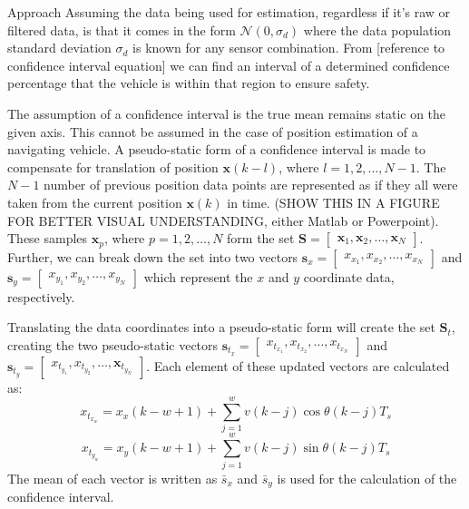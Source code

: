 \begin{section}{Approach}
Assuming the data being used for estimation, regardless if it's raw or filtered data, is that it comes in the form $\mathcal{N}(0,\sigma_d)$ where the data population standard deviation $\sigma_d$ is known for any sensor combination. From [reference to confidence interval equation] we can find an interval of a determined confidence percentage that the vehicle is within that region to ensure safety. 

The assumption of a confidence interval is the true mean remains static on the given axis. This cannot be assumed in the case of position estimation of a navigating vehicle. A pseudo-static form of a confidence interval is made to compensate for translation of position $\bm{x}(k-l)$, where $l=1,2,\dots,N-1$. The $N-1$ number of previous position data points are represented as if they all were taken from the current position $\bm{x}(k)$ in time. (SHOW THIS IN A FIGURE FOR BETTER VISUAL UNDERSTANDING, either Matlab or Powerpoint). These samples $\bm{x}_p$, where $p=1,2,\dots,N$ form the set $\mathcal{\bm{S}}=\begin{bmatrix}\bm{x}_1,\bm{x}_2,\dots,\bm{x}_N \end{bmatrix}$. Further, we can break down the set into two vectors $\bm{s}_x=\begin{bmatrix} x_x_1,x_x_2,\dots,x_x_N \end{bmatrix}$ and $\bm{s}_y=\begin{bmatrix} x_y_1,x_y_2,\dots,x_y_N \end{bmatrix}$ which represent the $x$ and $y$ coordinate data, respectively. 

Translating the data coordinates into a pseudo-static form will create the set $\mathcal{\bm{S}}_t$, creating the two pseudo-static vectors $\bm{s}_{t_x}=\begin{bmatrix} x_{t_x_1},x_{t_x_2},\dots,x_{t_x_N} \end{bmatrix}$ and $\bm{s}_{t_y}=\begin{bmatrix} x_{t_y_1},x_{t_y_2},\dots,\bm{x}_{t_y_N} \end{bmatrix}$. Each element of these updated vectors are calculated as:
    \begin{equation}
	x_{t_x_w} = x_x(k-w+1)+\sum_{j=1}^w v(k-j)\cos{\theta(k-j)T_s}
	\end{equation}
	\begin{equation}
	x_{t_y_w} = x_y(k-w+1)+\sum_{j=1}^w v(k-j)\sin{\theta(k-j)T_s}
	\end{equation}
The mean of each vector is written as $\bar{s}_x$ and $\bar{s}_y$ is used for the calculation of the confidence interval.


\end{section}

